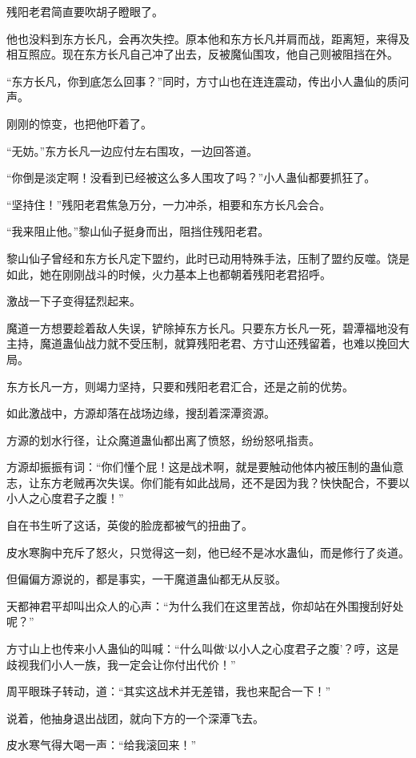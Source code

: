 \begin{this_body}
残阳老君简直要吹胡子瞪眼了。

他也没料到东方长凡，会再次失控。原本他和东方长凡并肩而战，距离短，来得及相互照应。现在东方长凡自己冲了出去，反被魔仙围攻，他自己则被阻挡在外。

“东方长凡，你到底怎么回事？”同时，方寸山也在连连震动，传出小人蛊仙的质问声。

刚刚的惊变，也把他吓着了。

“无妨。”东方长凡一边应付左右围攻，一边回答道。

“你倒是淡定啊！没看到已经被这么多人围攻了吗？”小人蛊仙都要抓狂了。

“坚持住！”残阳老君焦急万分，一力冲杀，相要和东方长凡会合。

“我来阻止他。”黎山仙子挺身而出，阻挡住残阳老君。

黎山仙子曾经和东方长凡定下盟约，此时已动用特殊手法，压制了盟约反噬。饶是如此，她在刚刚战斗的时候，火力基本上也都朝着残阳老君招呼。

激战一下子变得猛烈起来。

魔道一方想要趁着敌人失误，铲除掉东方长凡。只要东方长凡一死，碧潭福地没有主持，魔道蛊仙战力就不受压制，就算残阳老君、方寸山还残留着，也难以挽回大局。

东方长凡一方，则竭力坚持，只要和残阳老君汇合，还是之前的优势。

如此激战中，方源却落在战场边缘，搜刮着深潭资源。

方源的划水行径，让众魔道蛊仙都出离了愤怒，纷纷怒吼指责。

方源却振振有词：“你们懂个屁！这是战术啊，就是要触动他体内被压制的蛊仙意志，让东方老贼再次失误。你们能有如此战局，还不是因为我？快快配合，不要以小人之心度君子之腹！”

自在书生听了这话，英俊的脸庞都被气的扭曲了。

皮水寒胸中充斥了怒火，只觉得这一刻，他已经不是冰水蛊仙，而是修行了炎道。

但偏偏方源说的，都是事实，一干魔道蛊仙都无从反驳。

天都神君平却叫出众人的心声：“为什么我们在这里苦战，你却站在外围搜刮好处呢？”

方寸山上也传来小人蛊仙的叫喊：“什么叫做‘以小人之心度君子之腹’？哼，这是歧视我们小人一族，我一定会让你付出代价！”

周平眼珠子转动，道：“其实这战术并无差错，我也来配合一下！”

说着，他抽身退出战团，就向下方的一个深潭飞去。

皮水寒气得大喝一声：“给我滚回来！”


\end{this_body}
